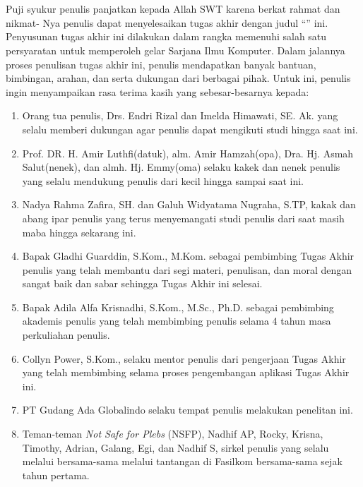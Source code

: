 \chapter*{\kataPengantar}

Puji syukur penulis panjatkan kepada Allah SWT karena berkat rahmat dan nikmat-
Nya penulis dapat menyelesaikan tugas akhir dengan judul “\judul” ini. Penyusunan tugas akhir ini dilakukan dalam rangka memenuhi
salah satu persyaratan untuk memperoleh gelar Sarjana Ilmu Komputer. Dalam
jalannya proses penulisan tugas akhir ini, penulis mendapatkan banyak bantuan,
bimbingan, arahan, dan serta dukungan dari berbagai pihak. Untuk ini, penulis ingin
menyampaikan rasa terima kasih yang sebesar-besarnya kepada:
\begin{enumerate}[topsep=0pt,itemsep=-1ex,partopsep=1ex,parsep=1ex]
    \item Orang tua penulis, Drs. Endri Rizal dan Imelda Himawati, SE. Ak. yang selalu memberi dukungan agar penulis dapat mengikuti studi hingga saat ini.
    \item Prof. DR. H. Amir Luthfi(datuk), alm. Amir Hamzah(opa), Dra. Hj. Asmah Salut(nenek), dan almh. Hj. Emmy(oma) selaku kakek dan nenek penulis yang selalu mendukung penulis dari kecil hingga sampai saat ini.
    \item Nadya Rahma Zafira, SH. dan Galuh Widyatama Nugraha, S.TP, kakak dan abang ipar penulis yang terus menyemangati studi penulis dari saat masih maba hingga sekarang ini.
	\item Bapak Gladhi Guarddin, S.Kom., M.Kom. sebagai pembimbing Tugas Akhir penulis yang telah membantu dari segi materi, penulisan, dan moral dengan sangat baik dan sabar sehingga Tugas Akhir ini selesai.
	\item Bapak Adila Alfa Krisnadhi, S.Kom., M.Sc., Ph.D. sebagai pembimbing akademis penulis yang telah membimbing penulis selama 4 tahun masa perkuliahan penulis.
	\item Collyn Power, S.Kom., selaku mentor penulis dari pengerjaan Tugas Akhir yang telah membimbing selama proses pengembangan aplikasi Tugas Akhir ini.
	\item PT Gudang Ada Globalindo selaku tempat penulis melakukan penelitan ini.
	\item Teman-teman \textit{Not Safe for Plebs} (NSFP), Nadhif AP, Rocky, Krisna, Timothy, Adrian, Galang, Egi, dan Nadhif S, sirkel penulis yang selalu melalui bersama-sama melalui tantangan di Fasilkom bersama-sama sejak tahun pertama.
\end{enumerate}

